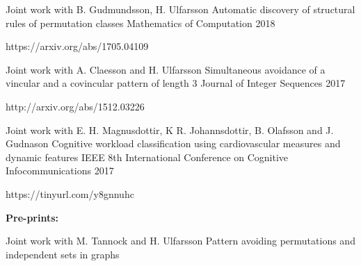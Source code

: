 


\begin{cventries}
  \cventry
    {Joint work with B. Gudmundsson, H. Ulfarsson} %
    {Automatic discovery of structural rules of permutation classes} %
    {Mathematics of Computation} %
    {2018} %
    {
      \begin{cvitems} %
        \item {https://arxiv.org/abs/1705.04109}
      \end{cvitems}
    }%
  \cventry
    {Joint work with A. Claesson and H. Ulfarsson} %
    {Simultaneous avoidance of a vincular and a covincular pattern of length 3} %
    {Journal of Integer Sequences} %
    {2017} %
    {
      \begin{cvitems} %
        \item {http://arxiv.org/abs/1512.03226}
      \end{cvitems}
    }%
  \cventry
    {Joint work with E. H. Magnusdottir, K R. Johannsdottir, B. Olafsson and J. Gudnason} %
    {Cognitive workload classification using cardiovascular measures and dynamic features\vspace{-1em}} %
    {\vspace{-0.5em}IEEE 8th International Conference on Cognitive Infocommunications} %
    {2017} %
    {
    \begin{cvitems} %
      \item {https://tinyurl.com/y8gnnuhc}
    \end{cvitems}
    }%
\begin{flushleft}
  \textbf{Pre-prints:}
\end{flushleft}
  \cventry
    {Joint work with M. Tannock and H. Ulfarsson} %
    {Pattern avoiding permutations and independent sets in graphs} %

\end{cventries}
